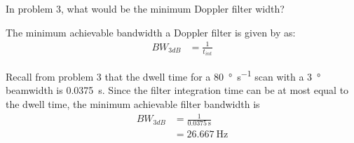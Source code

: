 \documentclass[12pt]{article}
\newenvironment{exercise}[2][Exercise]{\begin{trivlist}
    \item[\hskip \labelsep {\bfseries #1}\hskip \labelsep {\bfseries #2.}]}{\end{trivlist}}
\begin{document}
      \begin{exercise}{13}
      In problem 3, what would be the minimum Doppler filter width?

      The minimum achievable bandwidth a Doppler filter is given by \cite[p.~299]{IAR} as:
      \begin{align*}
      BW_{3 dB} & = \frac{1}{t_{int}}
      \end{align*}

      Recall from problem 3 that the dwell time for a \SI{80}{\degree\per\second} scan with a \SI{3}{\degree} beamwidth is \SI{0.0375}{\second}. Since the filter integration time can be at most equal to the dwell time, the minimum achievable filter bandwidth is
      \begin{align*}
      BW_{3 dB} & = \frac{1}{ \SI{0.0375}{\second} }\\
      &= \SI{26.667}{\Hz}
      \end{align*}
      \end{exercise}
      
\end{document}
